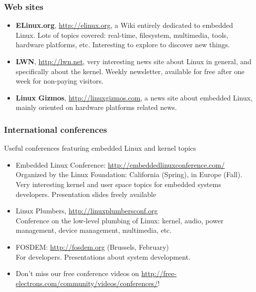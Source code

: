 \begin{frame}
  \frametitle{Web sites}
  \begin{itemize}
  \item {\bf ELinux.org}, \url{http://elinux.org}, a Wiki entirely
    dedicated to embedded Linux. Lots of topics covered: real-time,
    filesystem, multimedia, tools, hardware platforms,
    etc. Interesting to explore to discover new things.
  \item {\bf LWN}, \url{http://lwn.net}, very interesting news site
    about Linux in general, and specifically about the kernel. Weekly
    newsletter, available for free after one week for non-paying
    visitors.
  \item {\bf Linux Gizmos}, \url{http://linuxgizmos.com}, a news site
    about embedded Linux, mainly oriented on hardware platforms
    related news.
  \end{itemize}
\end{frame}

\begin{frame}
  \frametitle{International conferences}
  Useful conferences featuring embedded Linux and kernel topics
  \begin{itemize}
  \item Embedded Linux Conference: \url{http://embeddedlinuxconference.com/}\\
    Organized by the Linux Foundation: California (Spring), in Europe (Fall).
    Very interesting kernel and user space topics for embedded systems developers.
    Presentation slides freely available
  \item Linux Plumbers, \url{http://linuxplumbersconf.org}\\
    Conference on the low-level plumbing of Linux: kernel, audio,
    power management, device management, multimedia, etc.
  \item FOSDEM: \url{http://fosdem.org} (Brussels, February)\\
    For developers. Presentations about system development.
  \item Don't miss our free conference videos on
    \url{http://free-electrons.com/community/videos/conferences/}!
  \end{itemize}
\end{frame}

